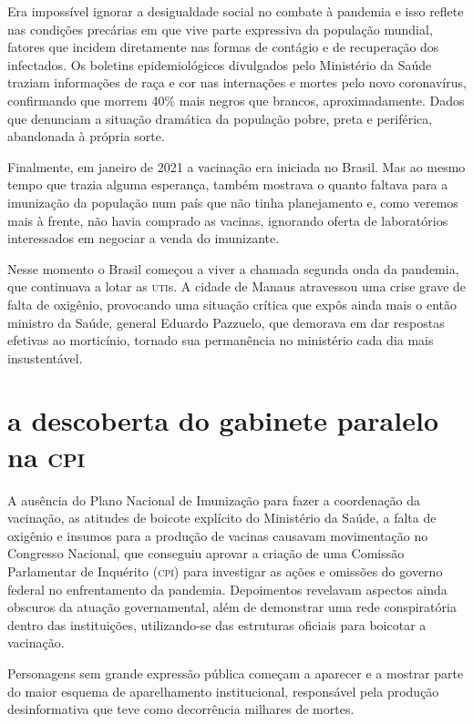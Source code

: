 Era impossível ignorar a desigualdade social no combate à pandemia e
isso reflete nas condições precárias em que vive parte expressiva da
população mundial, fatores que incidem diretamente nas formas de
contágio e de recuperação dos infectados. Os boletins epidemiológicos
divulgados pelo Ministério da Saúde traziam informações de raça e cor
nas internações e mortes pelo novo coronavírus, confirmando que morrem
40\% mais negros que brancos, aproximadamente. Dados que denunciam a
situação dramática da população pobre, preta e periférica, abandonada à
própria sorte.

Finalmente, em janeiro de 2021 a vacinação era iniciada no Brasil. Mas
ao mesmo tempo que trazia alguma esperança, também mostrava o quanto
faltava para a imunização da população num país que não tinha
planejamento e, como veremos mais à frente, não havia comprado as
vacinas, ignorando oferta de laboratórios interessados em negociar a
venda do imunizante.

Nesse momento o Brasil começou a viver a chamada segunda onda da
pandemia, que continuava a lotar as \textsc{uti}s. A cidade de Manaus atravessou
uma crise grave de falta de oxigênio, provocando uma situação crítica
que expôs ainda mais o então ministro da Saúde, general Eduardo
Pazzuelo, que demorava em dar respostas efetivas ao morticínio, tornado
sua permanência no ministério cada dia mais insustentável.

\section{a descoberta do gabinete paralelo na \textsc{cpi}}

A ausência do Plano Nacional de Imunização para fazer a coordenação da
vacinação, as atitudes de boicote explícito do Ministério da Saúde, a
falta de oxigênio e insumos para a produção de vacinas causavam
movimentação no Congresso Nacional, que conseguiu aprovar a criação de
uma Comissão Parlamentar de Inquérito (\textsc{cpi}) para investigar as ações e
omissões do governo federal no enfrentamento da pandemia. Depoimentos
revelavam aspectos ainda obscuros da atuação governamental, além de
demonstrar uma rede conspiratória dentro das instituições, utilizando-se
das estruturas oficiais para boicotar a vacinação.

Personagens sem grande expressão pública começam a aparecer e a mostrar
parte do maior esquema de aparelhamento institucional, responsável pela
produção desinformativa que teve como decorrência milhares de mortes.

